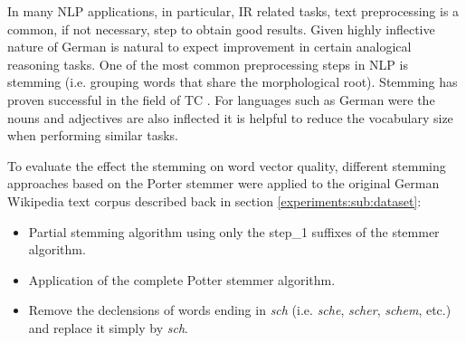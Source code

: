 In many \ac{NLP} applications, in particular, \ac{IR} related tasks,  text preprocessing is a common, if not
necessary, step to obtain good results. Given highly inflective nature of
German is natural to expect improvement in
certain analogical reasoning tasks.  One of the most common preprocessing steps in NLP is stemming (i.e. grouping
words that share the morphological root). Stemming has proven successful in
the field of \ac{TC} \cite{Sebastiani02}. For languages such as  German were the nouns and
adjectives are also inflected it is helpful to reduce the vocabulary size
when performing similar tasks.

To evaluate the effect the stemming on word vector quality, different
stemming approaches based on the Porter stemmer \cite{Porter80} were applied
to the original German  Wikipedia
text corpus described back in section \ref{experiments:sub:dataset}:

\begin{itemize} 
\item Partial stemming algorithm using only the step\_1 suffixes of the
  stemmer algorithm.
\item Application of the complete Potter stemmer algorithm.
\item Remove the declensions of words ending in  \textit{sch}  (i.e. \textit{sche}, \textit{scher},
\textit{schem}, etc.)  and replace it simply by \textit{sch}.
\end{itemize} 



